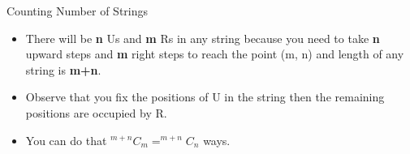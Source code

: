 \begin{frame}{Counting Number of Strings}
    \begin{itemize}
        \item There will be {\bf{n}} Us and {\bf{m}} Rs in any string because you need to take {\bf{n}} upward steps and {\bf{m}} right steps to reach the point (m, n) and length of any string is {\bf{m+n}}.
        \pause
        \item Observe that you fix the positions of U in the string then the remaining positions are occupied by R.
        \pause
        \item You can do that $^{m+n}C_m = ^{m+n}C_n$ ways.
    \end{itemize}
\end{frame}